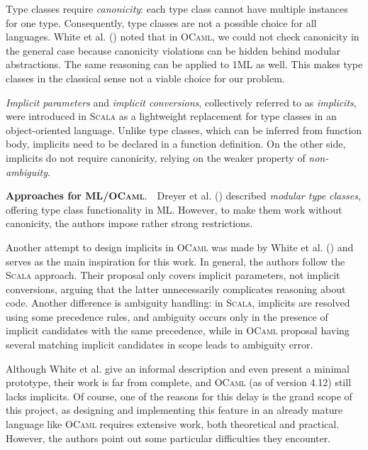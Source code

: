 \documentclass{spbau-diploma}
\begin{document}
Type classes require \textit{canonicity}: each type class cannot have multiple instances for one type. Consequently, type classes are not a possible choice for all languages. White et al. (\citeyear{white}) noted that in \textsc{OCaml}, we could not check canonicity in the general case because canonicity violations can be hidden behind modular abstractions. The same reasoning can be applied to \textsc{1ML} as well. This makes type classes in the classical sense not a viable choice for our problem.

\textit{Implicit parameters} and \textit{implicit conversions}, collectively referred to as \textit{implicits}, were introduced in \textsc{Scala} \citep{implicits} as a lightweight replacement for type classes in an object-oriented language. Unlike type classes, which can be inferred from function body, implicits need to be declared in a function definition. On the other side, implicits do not require canonicity, relying on the weaker property of \textit{non-ambiguity}.

\textbf{Approaches for \textsc{ML}/\textsc{OCaml}}.~~Dreyer et al. (\citeyear{ml_typeclasses}) described \textit{modular type classes}, offering type class functionality in \textsc{ML}. However, to make them work without canonicity, the authors impose rather strong restrictions. 

Another attempt to design implicits in \textsc{OCaml} was made by White et al. (\citeyear{white}) and serves as the main inspiration for this work. In general, the authors follow the \textsc{Scala} approach. Their proposal only covers implicit parameters, not implicit conversions, arguing that the latter unnecessarily complicates reasoning about code. Another difference is ambiguity handling: in \textsc{Scala}, implicits are resolved using some precedence rules, and ambiguity occurs only in the presence of implicit candidates with the same precedence, while in \textsc{OCaml} proposal having several matching implicit candidates in scope leads to ambiguity error.

Although White et al. give an informal description and even present a minimal prototype, their work is far from complete, and \textsc{OCaml} (as of version 4.12) still lacks implicits. Of course, one of the reasons for this delay is the grand scope of this project, as designing and implementing this feature in an already mature language like \textsc{OCaml} requires extensive work, both theoretical and practical. However, the authors point out some particular difficulties they encounter.
\end{document}
